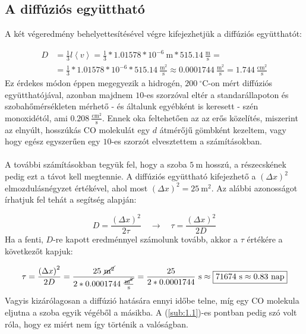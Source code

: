 \subsection{A diffúziós együttható}
A két végeredmény behelyettesítésével végre kifejezhetjük a diffúziós együtthatót:

\begin{align}
    D
    &=
    \frac{1}{3} l \left< v \right>
    =
    \frac{1}{3} * 1.01578 * 10^{-6}\ \text{m} * 515.14\ \frac{\text{m}}{\text{s}} = \nonumber \\
    &=
    \frac{1}{3} * 1.01578 * 10^{-6} * 515.14\ \frac{\text{m}^{2}}{\text{s}}
    \approx
    0.0001744\ \frac{\text{m}^{2}}{\text{s}}
    =
    \boxed{1.744\ \frac{\text{cm}^{2}}{\text{s}}}
\end{align}
Ez érdekes módon éppen megegyezik a hidrogén, $200\ ^{\circ}\text{C}$-on mért diffúziós együtthatójával, azonban majdnem $10$-es szorzóval eltér a standarállapoton és szobahőmérsékleten mérhető - és általunk egyébként is keresett - szén monoxidétól, ami $0.208\ \frac{\text{cm}^{2}}{\text{s}}$\cite{diffusivity}. Ennek oka feltehetően az az erős közelítés, miszerint az elnyúlt, hosszúkás CO molekulát egy $d$ átmérőjű gömbként kezeltem, vagy hogy egész egyszerűen egy $10$-es szorzót elvesztettem a számításokban.
\\ \\
A további számításokban tegyük fel, hogy a szoba $5\ \text{m}$ hosszú, a részecskének pedig ezt a távot kell megtennie. A diffúziós együttható kifejezhető a $\left( \Delta x \right)^{2}$ elmozdulásnégyzet értékével, ahol most $\left( \Delta x \right)^{2} = 25\ \text{m}^{2}$. Az alábbi azonosságot írhatjuk fel tehát a segítség alapján:

\begin{equation}
    D
    =
    \frac{\left( \Delta x \right)^{2}}{2 \tau}
    \quad \to \quad
    \tau
    =
    \frac{\left( \Delta x \right)^{2}}{2D}
\end{equation}
Ha a fenti, $D$-re kapott eredménnyel számolunk tovább, akkor a $\tau$ értékére a következőt kapjuk:

\begin{equation}
    \tau
    =
    \frac{\left( \Delta x \right)^{2}}{2D}
    =
    \frac{25\ \cancel{\text{m}^{2}}}{2 * 0.0001744\ \frac{\cancel{\text{m}^{2}}}{\text{s}}}
    =
    \frac{25}{2 * 0.0001744}\ \text{s}
    \approx
    \boxed{
    71674\ \text{s}
    \approx
    0.83\ \text{nap}
    }
\end{equation}
Vagyis kizárólagosan a diffúzió hatására ennyi időbe telne, míg egy CO molekula eljutna a szoba egyik végéből a másikba. A (\ref{sub:1.1})-es pontban pedig szó volt róla, hogy ez miért nem így történik a valóságban.